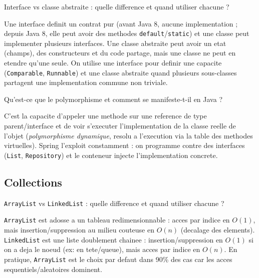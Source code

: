 \documentclass[11pt,a4paper]{article}
\begin{document}
\begin{question} Interface vs classe abstraite : quelle difference et quand utiliser chacune ?
\end{question}
\begin{reponse}
Une interface definit un contrat pur (avant Java 8, aucune implementation ; depuis Java 8, elle peut avoir des methodes \texttt{default}/\texttt{static}) et une classe peut implementer plusieurs interfaces. Une classe abstraite peut avoir un etat (champs), des constructeurs et du code partage, mais une classe ne peut en etendre qu'une seule. On utilise une interface pour definir une capacite (\texttt{Comparable}, \texttt{Runnable}) et une classe abstraite quand plusieurs sous-classes partagent une implementation commune non triviale.
\end{reponse}

\begin{question} Qu'est-ce que le polymorphisme et comment se manifeste-t-il en Java ?
\end{question}
\begin{reponse}
C'est la capacite d'appeler une methode sur une reference de type parent/interface et de voir s'executer l'implementation de la classe reelle de l'objet (\emph{polymorphisme dynamique}, resolu a l'execution via la table des methodes virtuelles). Spring l'exploit constamment : on programme contre des interfaces (\texttt{List}, \texttt{Repository}) et le conteneur injecte l'implementation concrete.
\end{reponse}

\subsection{Collections}

\begin{question} \texttt{ArrayList} vs \texttt{LinkedList} : quelle difference et quand utiliser chacune ?
\end{question}
\begin{reponse}
\texttt{ArrayList} est adosse a un tableau redimensionnable : acces par indice en $O(1)$, mais insertion/suppression au milieu couteuse en $O(n)$ (decalage des elements). \texttt{LinkedList} est une liste doublement chainee : insertion/suppression en $O(1)$ si on a deja le noeud (ex: en tete/queue), mais acces par indice en $O(n)$. En pratique, \texttt{ArrayList} est le choix par defaut dans 90\% des cas car les acces sequentiels/aleatoires dominent.
\end{reponse}
\end{document}
